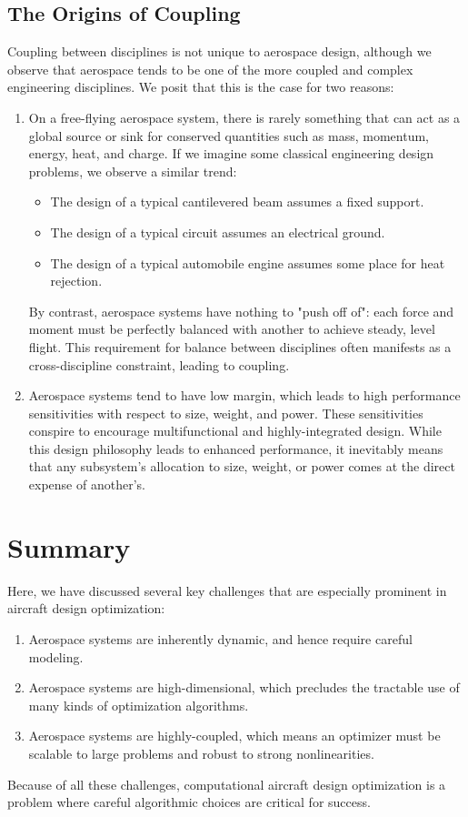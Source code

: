 \subsection{The Origins of Coupling}

Coupling between disciplines is not unique to aerospace design, although we observe that aerospace tends to be one of the more coupled and complex engineering disciplines. We posit that this is the case for two reasons:

\begin{enumerate}
    \item On a free-flying aerospace system, there is rarely something that can act as a global source or sink for conserved quantities such as mass, momentum, energy, heat, and charge. If we imagine some classical engineering design problems, we observe a similar trend:
    \begin{itemize}
        \item The design of a typical cantilevered beam assumes a fixed support.
        \item The design of a typical circuit assumes an electrical ground.
        \item The design of a typical automobile engine assumes some place for heat rejection.
    \end{itemize}
    By contrast, aerospace systems have nothing to "push off of": each force and moment must be perfectly balanced with another to achieve steady, level flight. This requirement for balance between disciplines often manifests as a cross-discipline constraint, leading to coupling.
    \item Aerospace systems tend to have low margin, which leads to high performance sensitivities with respect to size, weight, and power. These sensitivities conspire to encourage multifunctional and highly-integrated design. While this design philosophy leads to enhanced performance, it inevitably means that any subsystem's allocation to size, weight, or power comes at the direct expense of another's.
\end{enumerate}


\section{Summary}

Here, we have discussed several key challenges that are especially prominent in aircraft design optimization:

\begin{enumerate}
    \item Aerospace systems are inherently dynamic, and hence require careful modeling.
    \item Aerospace systems are high-dimensional, which precludes the tractable use of many kinds of optimization algorithms.
    \item Aerospace systems are highly-coupled, which means an optimizer must be scalable to large problems and robust to strong nonlinearities.
\end{enumerate}

Because of all these challenges, computational aircraft design optimization is a problem where careful algorithmic choices are critical for success.